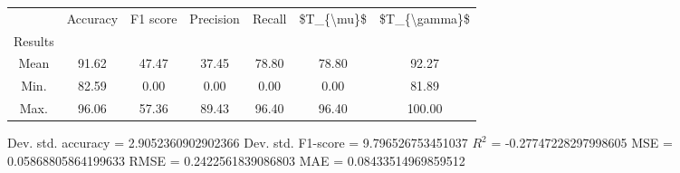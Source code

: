 \begin{tabular}{|c|c|c|c|c|c|c|}
\toprule
{} &  Accuracy &  F1 score &  Precision &  Recall &  \$T\_\{\textbackslash mu\}\$ &  \$T\_\{\textbackslash gamma\}\$ \\
Results &           &           &            &         &            &               \\
\hline
Mean    &     91.62 &     47.47 &      37.45 &   78.80 &      78.80 &         92.27 \\
Min.    &     82.59 &      0.00 &       0.00 &    0.00 &       0.00 &         81.89 \\
Max.    &     96.06 &     57.36 &      89.43 &   96.40 &      96.40 &        100.00 \\
\bottomrule
\end{tabular}

 Dev. std. accuracy = 2.9052360902902366
 Dev. std. F1-score = 9.796526753451037
 $R^2$ = -0.27747228297998605
 MSE = 0.05868805864199633
 RMSE = 0.2422561839086803
 MAE = 0.08433514969859512